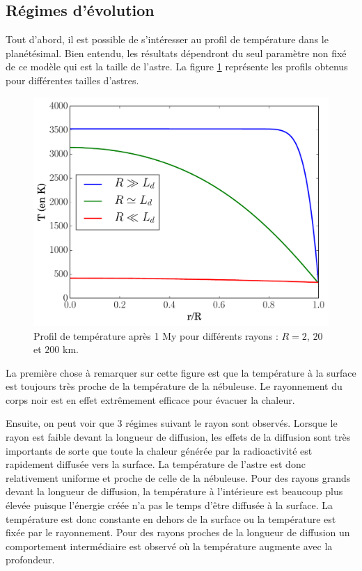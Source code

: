 \documentclass[10pt,a4paper]{article}
\numberwithin{equation}{section}
\begin{document}
\subsection{Régimes d'évolution}

Tout d'abord, il est possible de s'intéresser au profil de température dans le planétésimal. Bien entendu, les résultats dépendront du seul paramètre non fixé de ce modèle qui est la taille de l'astre. La figure \ref{diffusion2} représente les profils obtenus pour différentes tailles d'astres. 

\begin{figure}[h]
    \centering	    
	\includegraphics[scale=0.43]{figures/diffusion2.pdf}
    \caption{Profil de température après 1 My pour différents rayons : $R= 2$, $20$ et $200$ km. }
    	\label{diffusion2} 
\end{figure}

La première chose à remarquer sur cette figure est que la température à la surface est toujours très proche de la température de la nébuleuse. Le rayonnement du corps noir est en effet extrêmement efficace pour évacuer la chaleur. 
\medskip

Ensuite, on peut voir que 3 régimes suivant le rayon sont observés. Lorsque le rayon est faible devant la longueur de diffusion, les effets de la diffusion sont très importants de sorte que toute la chaleur générée par la radioactivité est rapidement diffusée vers la surface. La température de l'astre est donc relativement uniforme et proche de celle de la nébuleuse. Pour des rayons grands devant la longueur de diffusion, la température à l'intérieure est beaucoup plus élevée puisque l'énergie créée n'a pas le temps d'être diffusée à la surface. La température est donc constante en dehors de la surface ou la température est fixée par le rayonnement. Pour des rayons proches de la longueur de diffusion un comportement intermédiaire est observé où la température augmente avec la profondeur.
\end{document}
